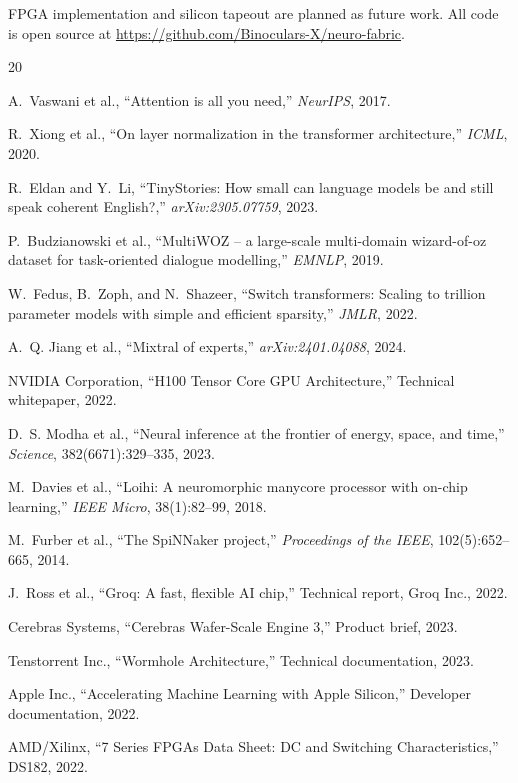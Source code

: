 \documentclass[11pt]{article}
\begin{document}
FPGA implementation and silicon tapeout are planned as future work. All code is
open source at \url{https://github.com/Binoculars-X/neuro-fabric}.


\begin{thebibliography}{20}

A.~Vaswani et al.,
``Attention is all you need,''
\emph{NeurIPS}, 2017.

R.~Xiong et al.,
``On layer normalization in the transformer architecture,''
\emph{ICML}, 2020.

R.~Eldan and Y.~Li,
``TinyStories: How small can language models be and still speak coherent English?,''
\emph{arXiv:2305.07759}, 2023.

P.~Budzianowski et al.,
``MultiWOZ -- a large-scale multi-domain wizard-of-oz dataset for task-oriented dialogue modelling,''
\emph{EMNLP}, 2019.

W.~Fedus, B.~Zoph, and N.~Shazeer,
``Switch transformers: Scaling to trillion parameter models with simple and efficient sparsity,''
\emph{JMLR}, 2022.

A.~Q. Jiang et al.,
``Mixtral of experts,''
\emph{arXiv:2401.04088}, 2024.

NVIDIA Corporation,
``H100 Tensor Core GPU Architecture,''
Technical whitepaper, 2022.

D.~S. Modha et al.,
``Neural inference at the frontier of energy, space, and time,''
\emph{Science}, 382(6671):329--335, 2023.

M.~Davies et al.,
``Loihi: A neuromorphic manycore processor with on-chip learning,''
\emph{IEEE Micro}, 38(1):82--99, 2018.

M.~Furber et al.,
``The SpiNNaker project,''
\emph{Proceedings of the IEEE}, 102(5):652--665, 2014.

J.~Ross et al.,
``Groq: A fast, flexible AI chip,''
Technical report, Groq Inc., 2022.

Cerebras Systems,
``Cerebras Wafer-Scale Engine 3,''
Product brief, 2023.

Tenstorrent Inc.,
``Wormhole Architecture,''
Technical documentation, 2023.

Apple Inc.,
``Accelerating Machine Learning with Apple Silicon,''
Developer documentation, 2022.

AMD/Xilinx,
``7 Series FPGAs Data Sheet: DC and Switching Characteristics,''
DS182, 2022.

\end{thebibliography}
\end{document}
